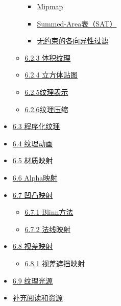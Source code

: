 \documentclass[
  paper=a4,
  ,captions=tableheading
]{scrartcl}
\providecommand{\tightlist}{%
  \setlength{\itemsep}{0pt}\setlength{\parskip}{0pt}}
\begin{document}
\begin{itemize}
\begin{itemize}
                \begin{itemize}
                  \tightlist
                  \item
                        \hyperref[Mipmap]{Mipmap}
                  \item
                        \hyperref[Summed-Areaux8868SAT]{Summed-Area表（SAT）}
                  \item
                        \hyperref[ux65e0ux7ea6ux675fux7684ux5404ux5411ux5f02ux6027ux8fc7ux6ee4]{无约束的各向异性过滤}
                \end{itemize}
          \item
                \hyperref[623-ux4f53ux79efux7eb9ux7406]{6.2.3 体积纹理}
          \item
                \hyperref[624-ux7acbux65b9ux4f53ux8d34ux56fe]{6.2.4 立方体贴图}
          \item
                \hyperref[625ux7eb9ux7406ux8868ux793a]{6.2.5纹理表示}
          \item
                \hyperref[626ux7eb9ux7406ux538bux7f29]{6.2.6纹理压缩}
        \end{itemize}
  \item
        \hyperref[63-ux7a0bux5e8fux5316ux7eb9ux7406]{6.3 程序化纹理}
  \item
        \hyperref[64-ux7eb9ux7406ux52a8ux753b]{6.4 纹理动画}
  \item
        \hyperref[65-ux6750ux8d28ux6620ux5c04]{6.5 材质映射}
  \item
        \hyperref[66-Alphaux6620ux5c04]{6.6 Alpha映射}
  \item
        \hyperref[67-ux51f9ux51f8ux6620ux5c04]{6.7 凹凸映射}

        \begin{itemize}
          \tightlist
          \item
                \hyperref[671-Blinnux65b9ux6cd5]{6.7.1 Blinn方法}
          \item
                \hyperref[672-ux6cd5ux7ebfux6620ux5c04]{6.7.2 法线映射}
        \end{itemize}
  \item
        \hyperref[68-ux89c6ux5deeux6620ux5c04]{6.8 视差映射}

        \begin{itemize}
          \tightlist
          \item
                \hyperref[681-ux89c6ux5deeux906eux6321ux6620ux5c04]{6.8.1
                  视差遮挡映射}
        \end{itemize}
  \item
        \hyperref[69-ux7eb9ux7406ux5149ux6e90]{6.9 纹理光源}
  \item
        \hyperref[ux8865ux5145ux9605ux8bfbux548cux8d44ux6e90]{补充阅读和资源}
\end{itemize}
\end{document}
